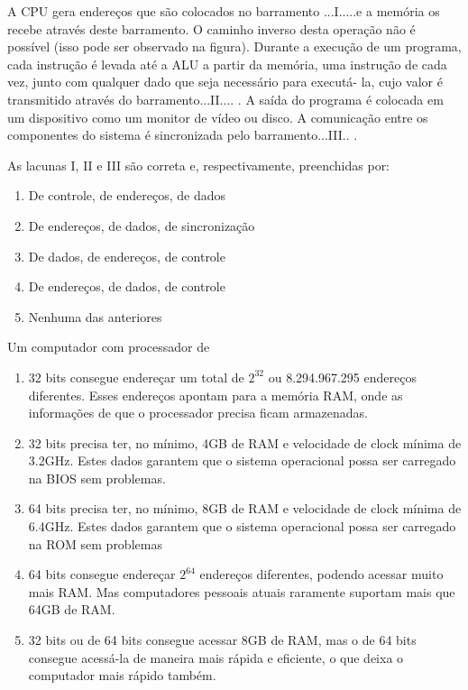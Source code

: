 \documentclass[aspectratio=169,
				xcolor=table]{beamer}
\begin{document}
	
	\begin{frame}
	A CPU gera endereços que são colocados no barramento ...I.....e a memória os recebe através deste barramento. O caminho inverso desta operação não é possível (isso pode ser observado na figura). Durante a execução de um programa, cada instrução é levada até a ALU a partir da memória, uma instrução de cada vez, junto com qualquer dado que seja necessário para executá- la, cujo valor é transmitido através do barramento...II.... . A saída do programa é colocada em um dispositivo como um monitor de vídeo ou disco. A comunicação entre os componentes do sistema é sincronizada pelo barramento...III.. .

As lacunas I, II e III são correta e, respectivamente, preenchidas por:

	\begin{enumerate}[a]
		\normalsize
		\item De controle, de endereços,  de dados
		\item De endereços,  de dados, de sincronização
		\item De dados, de endereços, de controle
		\item De endereços,  de dados,  de controle
		\item Nenhuma das anteriores
	\end{enumerate}


	\end{frame}
	
	\begin{frame}
	Um computador com processador de 
	\begin{enumerate}[a]
		\normalsize
		\item 32 bits consegue endereçar um total de $2^{32}$ ou 8.294.967.295 endereços diferentes. Esses endereços apontam para a memória RAM, onde as informações de que o processador precisa ficam armazenadas. 
		\item 32 bits precisa ter, no mínimo, 4GB de RAM e velocidade de clock mínima de 3.2GHz. Estes dados garantem que o sistema operacional possa ser carregado na BIOS sem problemas. 
		\item 64 bits precisa ter, no mínimo, 8GB de RAM e velocidade de clock mínima de 6.4GHz. Estes dados garantem que o sistema operacional possa ser carregado na ROM sem problemas
		\item 64 bits consegue endereçar $2^{64}$ endereços diferentes, podendo acessar muito mais RAM. Mas computadores pessoais atuais raramente suportam mais que 64GB de RAM. 
		\item 32 bits ou de 64 bits consegue acessar 8GB de RAM, mas o de 64 bits consegue acessá-la de maneira mais rápida e eficiente, o que deixa o computador mais rápido também. 
	\end{enumerate}

	\end{frame}
	
\end{document}
